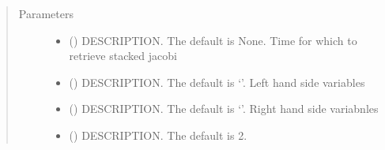 \documentclass[letterpaper,10pt,english]{sphinxmanual}
\begin{document}
\begin{fulllineitems}
\begin{fulllineitems}
\end{fulllineitems}


\begin{fulllineitems}
\label{\detokenize{core/modelnewton:modelnewton.newton_diff.show_stacked_diff}}
\pysigstartsignatures
{}
\pysigstopsignatures\begin{quote}\begin{description}
\item[{Parameters}] \leavevmode\begin{itemize}
\item {} 
\sphinxAtStartPar
{} (\sphinxstyleliteralemphasis{\sphinxupquote{, }}) \textendash{} DESCRIPTION. The default is None. Time for which to retrieve stacked jacobi

\item {} 
\sphinxAtStartPar
{} (\sphinxstyleliteralemphasis{\sphinxupquote{, }}) \textendash{} DESCRIPTION. The default is ‘’. Left hand side variables

\item {} 
\sphinxAtStartPar
{} (\sphinxstyleliteralemphasis{\sphinxupquote{, }}) \textendash{} DESCRIPTION. The default is ‘’. Right hand side variabnles

\item {} 
\sphinxAtStartPar
{} (\sphinxstyleliteralemphasis{\sphinxupquote{, }}) \textendash{} DESCRIPTION. The default is 2.


\end{itemize}
\end{description}
\end{quote}
\end{fulllineitems}
\end{fulllineitems}
\end{document}

